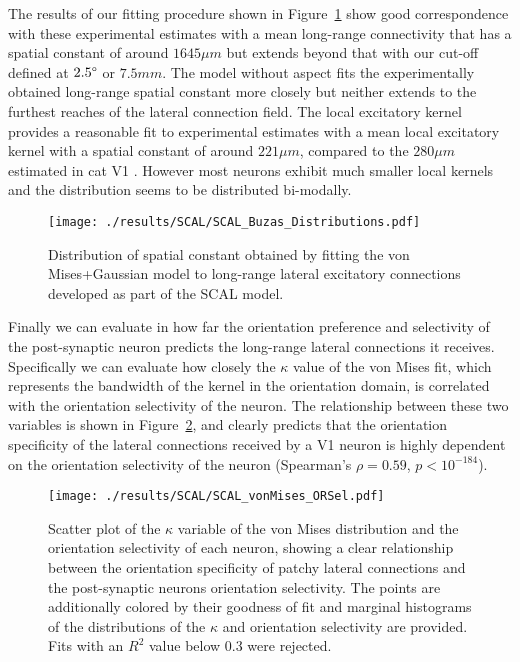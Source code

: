 The results of our fitting procedure shown in Figure~\ref{LatDist}
show good correspondence with these experimental estimates with a mean
long-range connectivity that has a spatial constant of around $1645
\mu m$ but extends beyond that with our cut-off defined at
$2.5\degree$ or $7.5 mm$. The model without aspect fits the
experimentally obtained long-range spatial constant more closely but
neither extends to the furthest reaches of the lateral connection
field. The local excitatory kernel provides a reasonable fit to
experimental estimates with a mean local excitatory kernel with a
spatial constant of around $221 \mu m$, compared to the $280 \mu m$
estimated in cat V1 \citep{Buzas2006}. However most neurons exhibit
much smaller local kernels and the distribution seems to be
distributed bi-modally.

\begin{figure}
	\centering
        \texttt{[image: ./results/SCAL/SCAL\_Buzas\_Distributions.pdf]}
	\caption[Distribution of spatial constants obtained by fitting
      Gaussian+vonMises model.]{Distribution of spatial constant
      obtained by fitting the \cite{Buzas2006} von Mises+Gaussian
      model to long-range lateral excitatory connections developed as
      part of the SCAL model.}
	\label{LatDist}
\end{figure}

Finally we can evaluate in how far the orientation preference and
selectivity of the post-synaptic neuron predicts the long-range
lateral connections it receives. Specifically we can evaluate how
closely the $\kappa$ value of the von Mises fit, which represents the
bandwidth of the kernel in the orientation domain, is correlated with
the orientation selectivity of the neuron. The relationship between
these two variables is shown in Figure~\ref{LatORKappa}, and clearly
predicts that the orientation specificity of the lateral connections
received by a V1 neuron is highly dependent on the orientation
selectivity of the neuron (Spearman's $\rho=0.59$, $p<10^{-184}$).


\begin{figure}
	\centering
        \texttt{[image: ./results/SCAL/SCAL\_vonMises\_ORSel.pdf]}
	\caption[Relationship between the width of vonMises distribution
      in the lateral connectivity model and the orientation
      selectivity of the neuron.]{Scatter plot of the $\kappa$
      variable of the von Mises distribution and the orientation
      selectivity of each neuron, showing a clear relationship between
      the orientation specificity of patchy lateral connections and
      the post-synaptic neurons orientation selectivity. The points
      are additionally colored by their goodness of fit and marginal
      histograms of the distributions of the $\kappa$ and orientation
      selectivity are provided. Fits with an $R^2$ value below 0.3
      were rejected.}
	\label{LatORKappa}
\end{figure}


